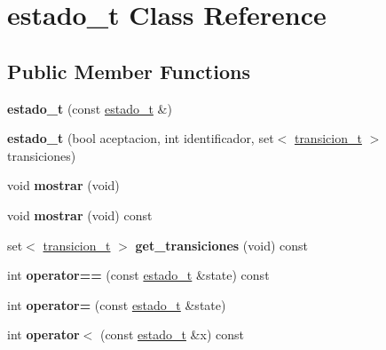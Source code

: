 \hypertarget{classestado__t}{\section{estado\-\_\-t Class Reference}
\label{classestado__t}
}
\subsection*{Public Member Functions}
\begin{DoxyCompactItemize}
\item 
\hypertarget{classestado__t_ac3dd69d9374264ee0a54868e60773473}{{\bfseries estado\-\_\-t} (const \hyperlink{classestado__t}{estado\-\_\-t} \&)}\label{classestado__t_ac3dd69d9374264ee0a54868e60773473}

\item 
\hypertarget{classestado__t_a6449b0df4424701fe557bb076eb9f686}{{\bfseries estado\-\_\-t} (bool aceptacion, int identificador, set$<$ \hyperlink{classtransicion__t}{transicion\-\_\-t} $>$ transiciones)}\label{classestado__t_a6449b0df4424701fe557bb076eb9f686}

\item 
\hypertarget{classestado__t_ae1a568503925422d4be8c8325e38f71f}{void {\bfseries mostrar} (void)}\label{classestado__t_ae1a568503925422d4be8c8325e38f71f}

\item 
\hypertarget{classestado__t_a768ace937d3f31ee65ebaffcdc5c7976}{void {\bfseries mostrar} (void) const }\label{classestado__t_a768ace937d3f31ee65ebaffcdc5c7976}

\item 
\hypertarget{classestado__t_a7970c00e049a6d91053f7db981238ccb}{set$<$ \hyperlink{classtransicion__t}{transicion\-\_\-t} $>$ {\bfseries get\-\_\-transiciones} (void) const }\label{classestado__t_a7970c00e049a6d91053f7db981238ccb}

\item 
\hypertarget{classestado__t_aefbf327933f9c506e5ed10da76e232b3}{int {\bfseries operator==} (const \hyperlink{classestado__t}{estado\-\_\-t} \&state) const }\label{classestado__t_aefbf327933f9c506e5ed10da76e232b3}

\item 
\hypertarget{classestado__t_ac4d7ea38c876de0a5a6f202ce76a4087}{int {\bfseries operator=} (const \hyperlink{classestado__t}{estado\-\_\-t} \&state)}\label{classestado__t_ac4d7ea38c876de0a5a6f202ce76a4087}

\item 
\hypertarget{classestado__t_a24971c1ca0bc0cc27669a54dbfae2c8e}{int {\bfseries operator$<$} (const \hyperlink{classestado__t}{estado\-\_\-t} \&x) const }\label{classestado__t_a24971c1ca0bc0cc27669a54dbfae2c8e}


\end{DoxyCompactItemize}
